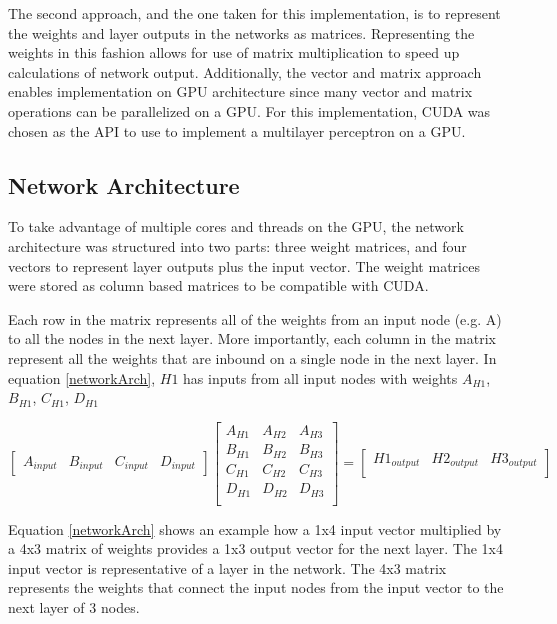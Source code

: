 \documentclass[jair, twoside,11pt,theapa]{article}
\begin{document}
The second approach, and the one taken for this implementation, is to represent the weights and layer outputs in the networks as matrices. 
Representing the weights in this fashion allows for use of matrix multiplication to speed up calculations of network output. 
Additionally, the vector and matrix approach enables implementation on GPU architecture since many vector and matrix operations can be parallelized on a GPU. 
For this implementation, CUDA was chosen as the API to use to implement a multilayer perceptron on a GPU. 

\subsection{Network Architecture}
To take advantage of multiple cores and threads on the GPU, the network architecture was structured into two parts: three weight matrices, and four vectors to represent layer outputs plus the input vector. 
The weight matrices were stored as column based matrices to be compatible with CUDA. 

Each row in the matrix represents all of the weights from an input node (e.g. A) to all the nodes in the next layer. 
More importantly, each column in the matrix represent all the weights that are inbound on a single node in the next layer. 
In equation \ref{networkArch}, $H1$ has inputs from all input nodes with weights $A_{H1}$, $B_{H1}$, $C_{H1}$, $D_{H1}$

\begin{equation}
\label{networkArch}
\left[
\begin{array}{cccc}
A_{input} & B_{input} & C_{input} & D_{input}
\end{array} 
\right]
%
\left[
\begin{array}{ccc}
A_{H1} & A_{H2} & A_{H3} \\
B_{H1} & B_{H2} & B_{H3} \\
C_{H1} & C_{H2} & C_{H3} \\
D_{H1} & D_{H2} & D_{H3} \\
\end{array} 
\right]
% 
= 
\left[
\begin{array}{ccc}
H1_{output} & H2_{output} & H3_{output} \\
\end{array} 
\right]
\end{equation}

Equation \ref{networkArch} shows an example how a 1x4 input vector multiplied by a 4x3 matrix of weights provides a 1x3 output vector for the next layer. 
The 1x4 input vector is representative of a layer in the network.
The 4x3 matrix represents the weights that connect the input nodes from the input vector to the next layer of 3 nodes. 
\end{document}

